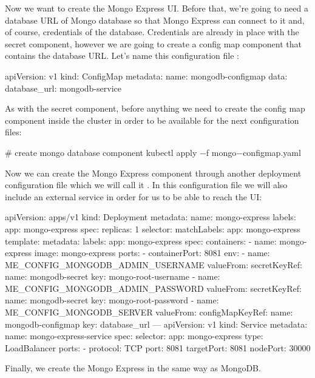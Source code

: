 Now we want to create the Mongo Express UI. Before that, we're going to need a database URL of Mongo database so that
Mongo Express can connect to it and, of course, credentials of the database. Credentials are already in place with
the secret component, however we are going to create a config map component that contains the database URL. Let's
name this configuration file :

\begin{block}
apiVersion: v1
kind: ConfigMap
metadata:
  name: mongodb-configmap
data:
  database_url: mongodb-service
\end{block}

As with the secret component, before anything we need to create the config map component inside the cluster in order
to be available for the next configuration files:

\begin{bash}
# create mongo database component
kubectl apply $-$f mongo$-$configmap.yaml
\end{bash}

Now we can create the Mongo Express component through another deployment configuration file which we will call it
. In this configuration file we will also include an external service in order for us to be
able to reach the UI:

\begin{block}
apiVersion: apps/v1
kind: Deployment
metadata:
  name: mongo-express
  labels:
    app: mongo-express
spec:
  replicas: 1
  selector:
    matchLabels:
      app: mongo-express
  template:
    metadata:
      labels:
        app: mongo-express
    spec:
      containers:
      - name: mongo-express
        image: mongo-express
        ports:
        - containerPort: 8081
        env:
        - name: ME_CONFIG_MONGODB_ADMIN_USERNAME
          valueFrom:
            secretKeyRef:
              name: mongodb-secret
              key: mongo-root-username
        - name: ME_CONFIG_MONGODB_ADMIN_PASSWORD
          valueFrom:
            secretKeyRef:
              name: mongodb-secret
              key: mongo-root-password
        - name: ME_CONFIG_MONGODB_SERVER
          valueFrom:
            configMapKeyRef:
              name: mongodb-configmap
              key: database_url
---
apiVersion: v1
kind: Service
metadata:
  name: mongo-express-service
spec:
  selector:
    app: mongo-express
  type: LoadBalancer
  ports:
    - protocol: TCP
      port: 8081
      targetPort: 8081
      nodePort: 30000
\end{block}

Finally, we create the Mongo Express in the same way as MongoDB\@.